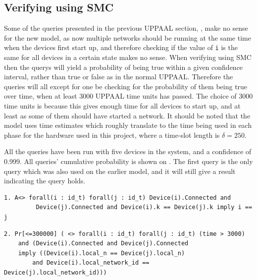 
\subsection*{Verifying using SMC}

Some of the queries presented in the previous UPPAAL section, , make no sense for the new model, as now multiple networks should be running at the same time when the devices first start up, and therefore checking if the value of \texttt{i} is the same for all devices in a certain state makes no sense.
When verifying using SMC then the querys will yield a probability of being true within a given confidence interval, rather than true or false as in the normal UPPAAL.
Therefore the queries will all except for one be checking for the probability of them being true over time, when at least 3000 UPPAAL time units has passed.
The choice of 3000 time units is because this gives enough time for all devices to start up, and at least as some of them should have started a network. 
It should be noted that the model uses time estimates which roughly translate to the time being used in each phase for the hardware used in this project, where a time-slot length is $\delta = 250$.

All the queries have been run with five devices in the system, and a confidence of 0.999.
All queries' cumulative probability is shown on .
The first query is the only query which was also used on the earlier model, and it will still give a result indicating the query holds.

\begin{lstlisting}[style=UPPAAL, title={This query requires that eventually if all devices are connected, then no pair of devices have the same \texttt{k}, unless the pair consists of the same two devices. This is true.}]
1. A<> forall(i : id_t) forall(j : id_t) Device(i).Connected and
         Device(j).Connected and Device(i).k == Device(j).k imply i == j
\end{lstlisting}

\begin{lstlisting}[style=UPPAAL, title={This query asks after 3000 UPPAAL time units has passed, what then is the probability that if two devices \texttt{i}, and \texttt{j} are connected to a network that their local values of \texttt{n} are the same, and that they are both connected to the same network. This means that the devices are connected to the same network. UPPAAL runs this query and within 3451 runs [0.998,1] with confidence 99.9 \% this is true. }]
2. Pr[<=300000] ( <> forall(i : id_t) forall(j : id_t) (time > 3000) 
    and (Device(i).Connected and Device(j).Connected 
    imply ((Device(i).local_n == Device(j).local_n)
        and Device(i).local_network_id == Device(j).local_network_id)))     
\end{lstlisting}

